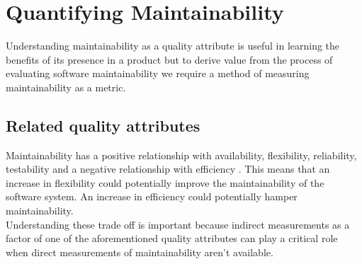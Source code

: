 \documentclass[dvips,12pt]{article}
\begin{document}
\section{Quantifying Maintainability}
Understanding maintainability as a quality attribute is useful in learning the benefits of  its presence in a product but to derive value from the process of evaluating software maintainability we require a method of measuring maintainability as a metric.

\subsection{Related quality attributes}
Maintainability has a positive relationship with availability, flexibility, reliability, testability and a negative relationship with efficiency \cite{karl_software_2003}. This means that an increase in flexibility could potentially improve the maintainability of the software system. An increase in efficiency could potentially hamper maintainability.\\

Understanding these trade off is important because indirect measurements as a factor of one of the aforementioned quality attributes can play a critical role when direct measurements of maintainability aren't available.
\end{document}
